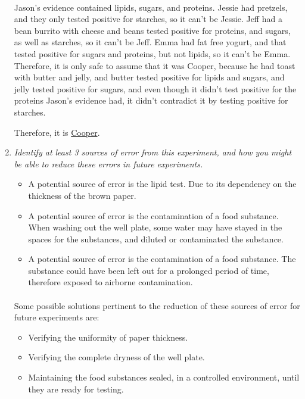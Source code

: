 \documentclass[12pt]{article}
\begin{document}
\begin{enumerate}
    \paragraph{} Jason's evidence contained lipids, sugars, and proteins. Jessie had pretzels, and they only tested positive for starches, so it can't be Jessie. Jeff had a bean burrito with cheese and beans tested positive for proteins, and sugars, as well as starches, so it can't be Jeff. Emma had fat free yogurt, and that tested positive for sugars and proteins, but not lipids, so it can't be Emma. Therefore, it is only safe to assume that it was Cooper, because he had toast with butter and jelly, and butter tested positive for lipids and sugars, and jelly tested positive for sugars, and even though it didn't test positive for the proteins Jason's evidence had, it didn't contradict it by testing positive for starches. 
        \begin{center} Therefore, it is \underline{Cooper}. \end{center}  
    \item  \textit{Identify at least 3 sources of error from this experiment, and how you might be able to reduce these errors in future experiments.}
    \begin{itemize} 
        \item A potential source of error is the lipid test. Due to its dependency on the thickness of the brown paper. 
        \item A potential source of error is the contamination of a food substance. When washing out the well plate, some water may have stayed in the spaces for the substances, and diluted or contaminated the substance. 
        \item A potential source of error is the contamination of a food substance. The substance could have been left out for a prolonged period of time, therefore exposed to airborne contamination.
    \end{itemize}
    \paragraph{} Some possible solutions pertinent to the reduction of these sources of error for future experiments are: 
    \begin{itemize}
        \item Verifying the uniformity of paper thickness.
        \item Verifying the complete dryness of the well plate.
        \item Maintaining the food substances sealed, in a controlled environment, until they are ready for testing.
    \end{itemize}
\end{enumerate}
\end{document}
